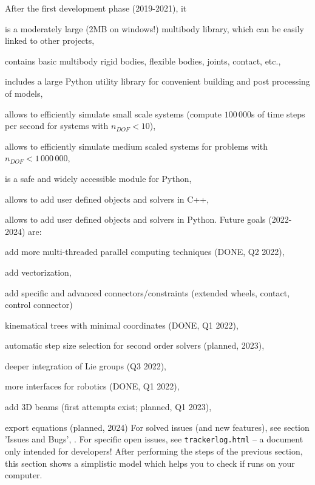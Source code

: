 After the first development phase (2019-2021), it
\bi
  \item is a moderately large (2MB on windows!) multibody library, which can be easily linked to other projects,
  \item contains basic multibody rigid bodies, flexible bodies, joints, contact, etc.,
  \item includes a large Python utility library for convenient building and post processing of models,
  \item allows to efficiently simulate small scale systems (compute $100\,000$s of time steps per second for systems with $n_{DOF}<10$),
  \item allows to efficiently simulate medium scaled systems for problems with $n_{DOF} < 1\,000\,000$,
  \item is a safe and widely accessible module for Python,
  \item allows to add user defined objects and solvers in C++,
  \item allows to add user defined objects and solvers in Python.
\ei
Future goals (2022-2024) are:
\bi
  \item add more multi-threaded parallel computing techniques (DONE, Q2 2022),
  \item add vectorization,
  \item add specific and advanced connectors/constraints (extended wheels, contact, control connector)
  \item kinematical trees with minimal coordinates (DONE, Q1 2022),
  \item automatic step size selection for second order solvers (planned, 2023),
  \item deeper integration of Lie groups (Q3 2022),
  \item more interfaces for robotics (DONE, Q1 2022),
  \item add 3D beams (first attempts exist; planned, Q1 2023),
  \item export equations (planned, 2024)
\ei
For solved issues (and new features), see section 'Issues and Bugs', .
For specific open issues, see \texttt{trackerlog.html} -- a document only intended for developers!
%
After performing the steps of the previous section, this section shows a simplistic model which helps you to check if \codeName runs on your computer.


